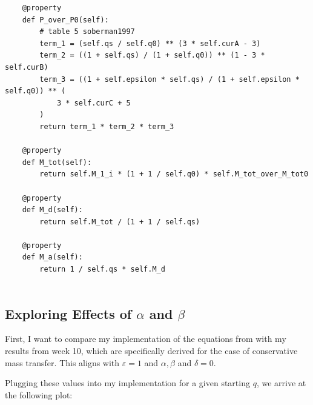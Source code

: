 \documentclass[a4paper,10pt]{article}
\begin{document}
\begin{verbatim}
    @property
    def P_over_P0(self):
        # table 5 soberman1997
        term_1 = (self.qs / self.q0) ** (3 * self.curA - 3)
        term_2 = ((1 + self.qs) / (1 + self.q0)) ** (1 - 3 * self.curB)
        term_3 = ((1 + self.epsilon * self.qs) / (1 + self.epsilon * self.q0)) ** (
            3 * self.curC + 5
        )
        return term_1 * term_2 * term_3

    @property
    def M_tot(self):
        return self.M_1_i * (1 + 1 / self.q0) * self.M_tot_over_M_tot0

    @property
    def M_d(self):
        return self.M_tot / (1 + 1 / self.qs)

    @property
    def M_a(self):
        return 1 / self.qs * self.M_d


\end{verbatim}

\subsection{Exploring Effects of \texorpdfstring{\(\alpha \) and \(\beta \)}{alpha and beta}}

First, I want to compare my implementation of the equations from \citet{soberman1997} with my results from week 10, which are specifically derived for the case of conservative mass transfer. This aligns with \(\varepsilon = 1\) and \(\alpha ,\beta \) and \(\delta =0\).

Plugging these values into my \citet{soberman1997} implementation for a given starting \(q\), we arrive at the following plot:

\begin{figure}[ht]
    \centering
\end{figure}

\begin{figure}[ht]
    \centering
\end{figure}
\end{document}
